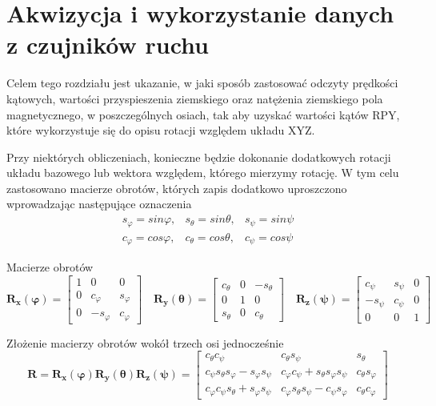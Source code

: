 \chapter{Akwizycja i wykorzystanie danych z czujników ruchu}

Celem tego rozdziału jest ukazanie, w jaki sposób zastosować odczyty prędkości kątowych, wartości przyspieszenia ziemskiego oraz natężenia ziemskiego pola magnetycznego, w poszczególnych osiach, tak aby uzyskać wartości kątów RPY, które wykorzystuje się do opisu rotacji względem układu XYZ. 

Przy niektórych obliczeniach, konieczne będzie dokonanie dodatkowych rotacji układu bazowego lub wektora względem, którego mierzymy rotację. W tym celu zastosowano macierze obrotów, których zapis dodatkowo uproszczono wprowadzając następujące oznaczenia
$$
    \begin{array}{ccc}
        s_{\varphi} = sin\varphi, & s_{\theta} = sin\theta, & s_{\psi} = sin\psi \\
        c_{\varphi} = cos\varphi, & c_{\theta} = cos\theta, & c_{\psi} = cos\psi
    \end{array}
$$

Macierze obrotów
$$
    \mathbf{R_x(\varphi)} =
    \left[
        \begin{array}{ccc}
            1 & 0 & 0 \\
            0 & c_{\varphi} & s_{\varphi} \\
            0 & -s_{\varphi} & c_{\varphi}
        \end{array}
    \right]
    \quad
    \mathbf{R_y(\theta)} =
    \left[
        \begin{array}{ccc}
            c_{\theta} & 0 & -s_{\theta} \\
            0 & 1 & 0 \\
            s_{\theta} & 0 & c_{\theta}
        \end{array}
    \right]
    \quad
    \mathbf{R_z(\psi)} =
    \left[
        \begin{array}{ccc}
            c_{\psi} & s_{\psi} & 0 \\
            -s_{\psi} & c_{\psi} & 0 \\
            0 & 0 & 1
        \end{array}
    \right]
$$

Złożenie macierzy obrotów wokół trzech osi jednocześnie
$$
    \mathbf{R} =
    \mathbf{R_x(\varphi)R_y(\theta)R_z(\psi)} =
    \left[
        \begin{array}{ccc}
            c_{\theta}c_{\psi} & c_{\theta}s_{\psi} & s_{\theta} \\
            c_{\psi}s_{\theta}s_{\varphi} - s_{\varphi}s_{\psi} & c_{\varphi}c_{\psi} + s_{\theta}s_{\varphi}s_{\psi} & c_{\theta}s_{\varphi} \\
            c_{\varphi}c_{\psi}s_{\theta} + s_{\varphi}s_{\psi} & c_{\varphi}s_{\theta}s_{\psi} - c_{\psi}s_{\varphi} & c_{\theta}c_{\varphi}
        \end{array}
    \right]
$$
